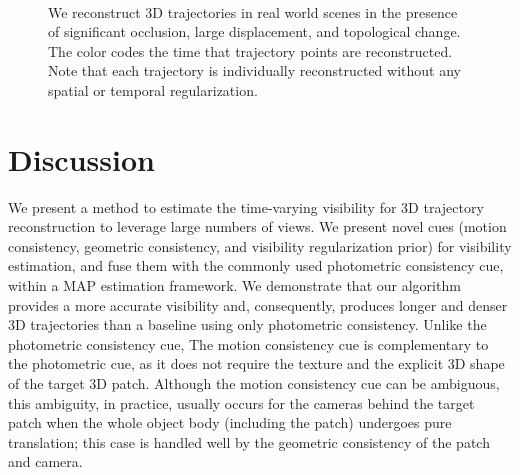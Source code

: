\documentclass[10pt,twocolumn,letterpaper]{article}
\begin{document}
\begin{figure*}[th]
  \centering       
    \\
  \caption{We reconstruct 3D trajectories in real world scenes in the presence of significant occlusion, large displacement, and topological change. The color codes the time that trajectory points are reconstructed. Note that each trajectory is individually reconstructed without any spatial or temporal regularization.} 
  \label{Fig:qualtitative}
\end{figure*}



\section{Discussion}
We present a method to estimate the time-varying visibility for 3D trajectory reconstruction to leverage large numbers of views. We present novel cues (motion consistency, geometric consistency, and visibility regularization prior) for visibility estimation, and fuse them with the commonly used photometric consistency cue, within a MAP estimation framework. We demonstrate that our algorithm provides a more accurate visibility and, consequently, produces longer and denser 3D trajectories than a baseline using only photometric consistency. Unlike the photometric consistency cue, The motion consistency cue is complementary to the photometric cue, as it does not require the texture and the explicit 3D shape of the target 3D patch. Although the motion consistency cue can be ambiguous, this ambiguity, in practice, usually occurs for the cameras behind the target patch when the whole object body (including the patch) undergoes pure translation; this case is handled well by the geometric consistency of the patch and camera. 
\end{document}
